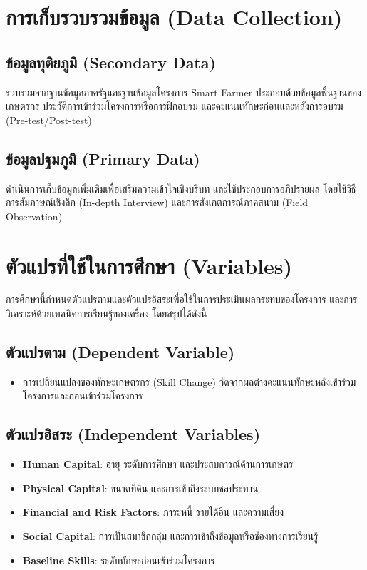 \section{การเก็บรวบรวมข้อมูล (Data Collection)}

\subsection{ข้อมูลทุติยภูมิ (Secondary Data)}

รวบรวมจากฐานข้อมูลภาครัฐและฐานข้อมูลโครงการ Smart Farmer 
ประกอบด้วยข้อมูลพื้นฐานของเกษตรกร ประวัติการเข้าร่วมโครงการหรือการฝึกอบรม 
และคะแนนทักษะก่อนและหลังการอบรม (Pre-test/Post-test)

\subsection{ข้อมูลปฐมภูมิ (Primary Data)}

ดำเนินการเก็บข้อมูลเพิ่มเติมเพื่อเสริมความเข้าใจเชิงบริบท 
และใช้ประกอบการอภิปรายผล โดยใช้วิธีการสัมภาษณ์เชิงลึก (In-depth Interview) 
และการสังเกตการณ์ภาคสนาม (Field Observation)


\section{ตัวแปรที่ใช้ในการศึกษา (Variables)}

การศึกษานี้กำหนดตัวแปรตามและตัวแปรอิสระเพื่อใช้ในการประเมินผลกระทบของโครงการ 
และการวิเคราะห์ด้วยเทคนิคการเรียนรู้ของเครื่อง โดยสรุปได้ดังนี้

\subsection{ตัวแปรตาม (Dependent Variable)}

\begin{itemize}
\item การเปลี่ยนแปลงของทักษะเกษตรกร (Skill Change) 
วัดจากผลต่างคะแนนทักษะหลังเข้าร่วมโครงการและก่อนเข้าร่วมโครงการ
\end{itemize}

\subsection{ตัวแปรอิสระ (Independent Variables)}

\begin{itemize}
\item \textbf{Human Capital}: อายุ ระดับการศึกษา และประสบการณ์ด้านการเกษตร

\item \textbf{Physical Capital}: ขนาดที่ดิน และการเข้าถึงระบบชลประทาน

\item \textbf{Financial and Risk Factors}: ภาระหนี้ รายได้อื่น และความเสี่ยง

\item \textbf{Social Capital}: การเป็นสมาชิกกลุ่ม และการเข้าถึงข้อมูลหรือช่องทางการเรียนรู้

\item \textbf{Baseline Skills}: ระดับทักษะก่อนเข้าร่วมโครงการ
\end{itemize}

